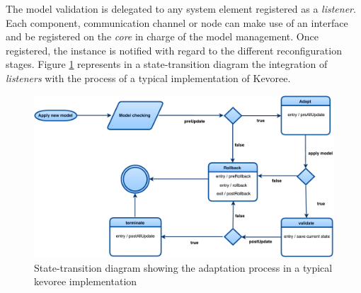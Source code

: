 The model validation is delegated to any system element registered as a \textit{listener}.
Each component, communication channel or node can make use of an interface and be registered on the \textit{core} in charge of the model management.
Once registered, the instance is notified with regard to the different reconfiguration stages.
Figure \ref{fig:MAR_modelListener} represents in a state-transition diagram the integration of \textit{listeners} with the process of a typical implementation of Kevoree.

\begin{figure}[]
	\centering
	\includegraphics[width=1\columnwidth]{chapters/modelsAtRuntimeIoT.images/ModelListenerStateChart.pdf}
	\caption{State-transition diagram showing the adaptation process in a typical kevoree implementation}
	\label{fig:MAR_modelListener}
\end{figure}

